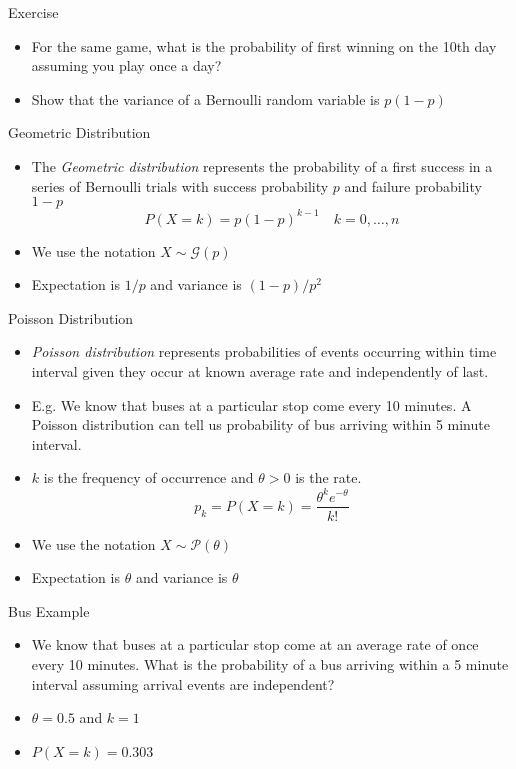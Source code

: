 \documentclass{beamer}
\begin{document}
\begin{frame}{Exercise} 
\begin{itemize} 
 \item For the same game, what is the probability of first winning on the 10th day assuming you play once a day? 
 \item Show that the variance of a Bernoulli random variable is $p(1-p)$ 
\end{itemize}
\end{frame}

\begin{frame}{Geometric Distribution} 
\begin{itemize} 
 \item The \emph{Geometric distribution} represents the probability of a first success in a series of Bernoulli trials with success probability $p$ and failure probability $1-p$  
 \begin{displaymath} 
 P(X = k) = p (1-p)^{k-1} \quad  k = 0, \ldots, n
\end{displaymath}
\item We use the notation $X \sim \mathcal{G}(p)$
\item Expectation is $1/p$ and variance is $(1-p)/p^2$
\end{itemize}
\end{frame}

\begin{frame}{Poisson Distribution}  
\begin{itemize} 
 \item \emph{Poisson distribution} represents probabilities of events occurring within time interval given they occur at known average rate and independently of last.  
 \item E.g. We know that buses at a particular stop come every 10 minutes. A Poisson distribution can tell us probability of bus arriving within 5 minute interval. 
 \item $k$ is the frequency of occurrence and $\theta > 0$ is the rate. 
 \begin{displaymath} 
  p_k = P(X = k) = \frac{\theta^k e^{-\theta}}{k!}
 \end{displaymath}
\item We use the notation $X \sim \mathcal{P}(\theta)$
\item Expectation is $\theta$ and variance is $\theta$ 
\end{itemize}
\end{frame}

\begin{frame}{Bus Example}  
\begin{itemize} 
 \item We know that buses at a particular stop come at an average rate of once every 10 minutes. What is the probability of a bus arriving within a 5 minute interval assuming arrival events are independent?
 \item $\theta = 0.5$ and $k = 1$ 
 \item $P(X = k) = 0.303$ 
\end{itemize}
\end{frame}
\end{document}
